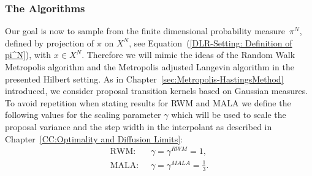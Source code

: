 \subsubsection{The Algorithms}
\label{sec:sub:DLR-Algo}

Our goal is now to sample from the finite dimensional probability measure~$\pi^N$, defined by projection of $\pi$ on $X^N$, see Equation~(\ref{DLR-Setting: Definition of pi^N}), with $x \in X^N$. Therefore we will mimic the ideas of the Random Walk Metropolis algorithm and the Metropolis adjusted Langevin algorithm in the presented Hilbert setting. As in Chapter~\ref{sec:Metropolis-HastingsMethod} introduced, we consider proposal transition kernels based on Gaussian measures. To avoid repetition when stating results for RWM and MALA we define the following values for the scaling parameter $\gamma$ which will be used to scale the proposal variance and the step width in the interpolant as described in Chapter~\ref{CC:Optimality and Diffusion Limits}:
\begin{align}
 \text{RWM: } & \; \gamma = \gamma^{RWM} = 1, \\
 \text{MALA: } & \; \gamma = \gamma^{MALA} = \frac{1}{3}.
\end{align}


